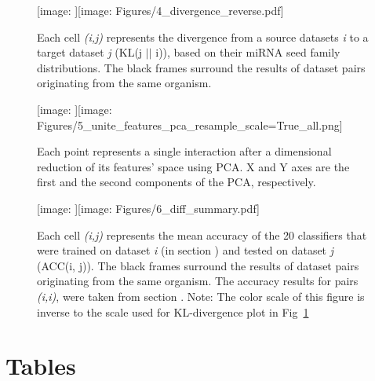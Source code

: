 \documentclass{bmcart}
\def\texttt{[image: ]}
\begin{document}
\begin{backmatter}
\begin{figure}[h!]
  \caption{}
      \texttt{[image: Figures/4\_divergence\_reverse.pdf]}
      \label{fig:divergence}
      \caption*{Each cell \textit{(i,j)} represents the divergence from  a source datasets \textit{i} to a target dataset \textit{j} (KL(j $||$ i)), based on their miRNA seed family distributions. The black frames surround the results of dataset pairs originating from the same organism.}
      \end{figure}


\begin{figure}[h!]
  \caption{} 
       \texttt{[image: Figures/5\_unite\_features\_pca\_resample\_scale=True\_all.png]}
      \label{fig:feature_pca}
      \caption*{Each point represents a single interaction after a dimensional reduction of its features' space using PCA. X and Y axes are the first and the second components of the PCA, respectively.}
      \end{figure}




\begin{figure}[h!]
  \caption{}
      \texttt{[image: Figures/6\_diff\_summary.pdf]}
    \label{fig:crossdataset}
    \caption*{Each cell \textit{(i,j)} represents the mean accuracy of the 20 classifiers that were trained on dataset \textit{i} (in section ) and tested on dataset \textit{j} (ACC(i, j)). The black frames surround the results of dataset pairs originating from the same organism. The accuracy results for pairs \textit{(i,i)}, were taken from section . Note: The color scale of this figure is inverse to the scale used for KL-divergence plot in Fig~\ref{fig:divergence}}
      \end{figure}




\clearpage
\section*{Tables}


\end{backmatter}
\end{document}
